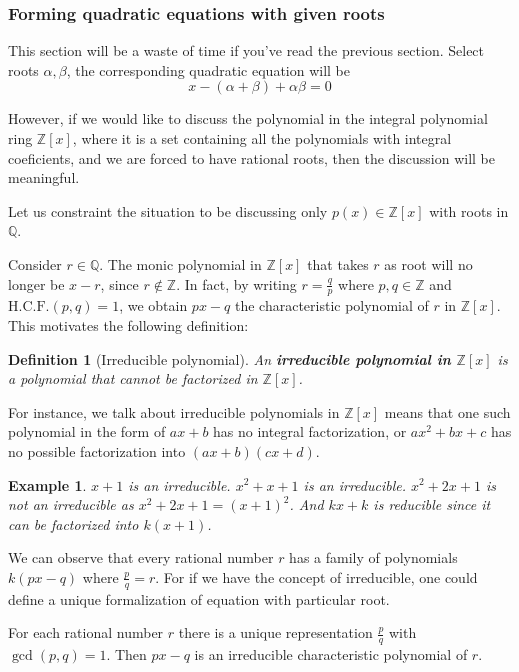 \documentclass[12pt]{article}
\newtheorem{definition}{Definition}[section]
\newtheorem*{example}{Example}
\begin{document}
    \subsubsection*{Forming quadratic equations with given roots}

    This section will be a waste of time if you've read the previous section. Select roots $\alpha,\beta$, the corresponding quadratic equation will be \[x-(\alpha+\beta)+\alpha\beta=0\]

    However, if we would like to discuss the polynomial in the integral polynomial ring $\mathbb{Z}[x]$, where it is a set containing all the polynomials with integral coeficients, and we are forced to have rational roots, then the discussion will be meaningful.

    Let us constraint the situation to be discussing only $p(x)\in \mathbb{Z}[x]$ with roots in $\mathbb{Q}$. 

    Consider $r\in\mathbb{Q}$. The monic polynomial in $\mathbb{Z}[x]$ that takes $r$ as root will no longer be $x-r$, since $r\notin \mathbb{Z}$. In fact, by writing $r=\frac{q}{p}$ where $p,q\in\mathbb{Z}$ and $\mathrm{H.C.F.}(p,q)=1$, we obtain $px-q$ the characteristic polynomial of $r$ in $\mathbb{Z}[x]$. This motivates the following definition:

    \begin{definition}[Irreducible polynomial]
        An \textbf{irreducible polynomial in $\mathbb{Z}[x]$} is a polynomial that cannot be factorized in $\mathbb{Z}[x]$. 
    \end{definition}

    For instance, we talk about irreducible polynomials in $\mathbb{Z}[x]$ means that one such polynomial in the form of $ax+b$ has no integral factorization, or $ax^2+bx+c$ has no possible factorization into $(ax+b)(cx+d)$.

    \begin{example}
        $x+1$ is an irreducible. $x^2+x+1$ is an irreducible. $x^2+2x+1$ is not an irreducible as $x^2+2x+1=(x+1)^2$. And $kx+k$ is reducible since it can be factorized into $k(x+1)$.
    \end{example}

    We can observe that every rational number $r$ has a family of polynomials $k(px-q)$ where $\frac{p}{q}=r$. For if we have the concept of irreducible, one could define a unique formalization of equation with particular root.

    For each rational number $r$ there is a unique representation $\frac{p}{q}$ with $\gcd(p,q)=1$. Then $px-q$ is an irreducible characteristic polynomial of $r$.
\end{document}
